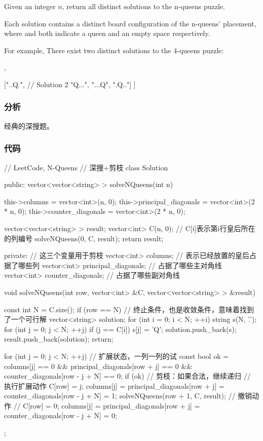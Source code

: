 Given an integer $n$, return all distinct solutions to the n-queens puzzle.

Each solution contains a distinct board configuration of the n-queens' placement, where  and  both indicate a queen and an empty space respectively.

For example,
There exist two distinct solutions to the 4-queens puzzle:
\begin{Code}
[
 [".Q..",  // Solution 1
  "...Q",
  "Q...",
  "..Q."],

 ["..Q.",  // Solution 2
  "Q...",
  "...Q",
  ".Q.."]
]
\end{Code}


\subsubsection{分析}
经典的深搜题。

\subsubsection{代码}
\begin{Code}
// LeetCode, N-Queens
// 深搜+剪枝
class Solution {
public:
    vector<vector<string> > solveNQueens(int n) {
        this->columns = vector<int>(n, 0);
        this->principal_diagonals = vector<int>(2 * n, 0);
        this->counter_diagonals = vector<int>(2 * n, 0);

        vector<vector<string> > result;
        vector<int> C(n, 0);  // C[i]表示第i行皇后所在的列编号
        solveNQueens(0, C, result);
        return result;
    }
private:
    // 这三个变量用于剪枝
    vector<int> columns;  // 表示已经放置的皇后占据了哪些列
    vector<int> principal_diagonals;  // 占据了哪些主对角线
    vector<int> counter_diagonals;  // 占据了哪些副对角线

    void solveNQueens(int row, vector<int> &C,
            vector<vector<string> > &result) {
        const int N = C.size();
        if (row == N) { // 终止条件，也是收敛条件，意味着找到了一个可行解
            vector<string> solution;
            for (int i = 0; i < N; ++i) {
                string s(N, '.');
                for (int j = 0; j < N; ++j) {
                    if (j == C[i]) s[j] = 'Q';
                }
                solution.push_back(s);
            }
            result.push_back(solution);
            return;
        }

        for (int j = 0; j < N; ++j) {  // 扩展状态，一列一列的试
            const bool ok = columns[j] == 0 &&
                    principal_diagonals[row + j] == 0
                    && counter_diagonals[row - j + N] == 0;
            if (ok) {  // 剪枝：如果合法，继续递归
                // 执行扩展动作
                C[row] = j;
                columns[j] = principal_diagonals[row + j] =
                        counter_diagonals[row - j + N] = 1;
                solveNQueens(row + 1, C, result);
                // 撤销动作
                // C[row] = 0;
                columns[j] = principal_diagonals[row + j] =
                        counter_diagonals[row - j + N] = 0;
            }
        }
    }
};
\end{Code}


